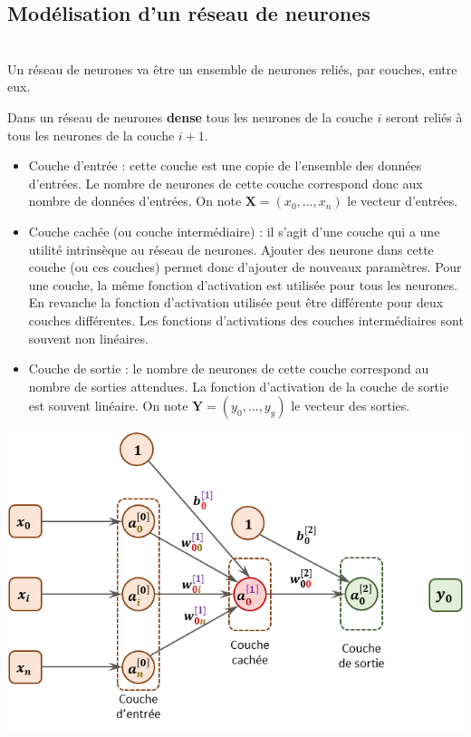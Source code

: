 \subsection{Modélisation d'un réseau de neurones} 

\begin{defi}[Couches] ~\\

Un réseau de neurones va être un ensemble de neurones reliés, par couches, entre eux. 

Dans un réseau de neurones \textbf{dense} tous les neurones de la couche $i$ seront reliés à tous les neurones de la couche $i+1$.

\begin{itemize}
\item Couche d'entrée : cette couche est une copie de l'ensemble des données d'entrées. Le nombre de neurones de cette couche correspond donc aux nombre de données d'entrées. On note $\mathbf{X} = \left( x_0, ..., x_n\right)$ le vecteur d'entrées.
\item Couche cachée (ou couche intermédiaire) : il s'agit d'une couche qui a une utilité intrinsèque au réseau de neurones. Ajouter des neurone dans cette couche (ou ces couches) permet donc d'ajouter de nouveaux paramètres.  Pour une couche, la même fonction d'activation est utilisée pour tous les neurones. En revanche la fonction d'activation utilisée peut être différente pour deux couches différentes. Les fonctions d'activations des couches intermédiaires sont souvent non linéaires.
\item Couche de sortie : le nombre de neurones de cette couche correspond au nombre de sorties attendues. La fonction d'activation de la couche de sortie est souvent linéaire. On note $\mathbf{Y} = \left( y_0, ..., y_y\right)$ le vecteur des sorties.
\end{itemize}
\begin{center}
\includegraphics[width=.8\linewidth]{images/fig_04}
\end{center}


\end{defi}
